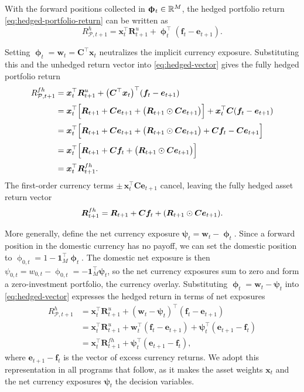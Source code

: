With the forward positions collected in $\bm{\upphi}_t\in\mathbb{R}^M$, the hedged portfolio return \eqref{eq:hedged-portfolio-return} can be written as
\begin{equation}
R^{h}_{\mathcal{P},t+1} = \bm{x}_t^\top \bm{R}^{u}_{t+1} + \bm{\upphi}_t^\top(\bm{f}_t-\bm{e}_{t+1}).
\label{eq:hedged-vector}
\end{equation}

Setting $\bm{\upphi}_t=\bm{w}_t=\bm{C}^\top\bm{x}_t$ neutralizes the implicit currency exposure. Substituting this and the unhedged return vector into \eqref{eq:hedged-vector} gives the fully hedged portfolio return
\begin{align*}
R^{fh}_{\mathcal{P},t+1}
&= \bm{x}_t^\top\bm{R}^{u}_{t+1} + \big(\bm{C}^\top\bm{x}_t\big)^\top(\bm{f}_t-\bm{e}_{t+1})\\[2pt]
&= \bm{x}_t^\top\Big[\bm{R}_{t+1} + \bm{C}\bm{e}_{t+1} + \big(\bm{R}_{t+1}\odot\bm{C}\bm{e}_{t+1}\big)\Big] + \bm{x}_t^\top\bm{C}(\bm{f}_t-\bm{e}_{t+1})\\[2pt]
&= \bm{x}_t^\top\Big[\bm{R}_{t+1} + \bm{C}\bm{e}_{t+1} + \big(\bm{R}_{t+1}\odot\bm{C}\bm{e}_{t+1}\big) + \bm{C}\bm{f}_t - \bm{C}\bm{e}_{t+1}\Big]\\[2pt]
&= \bm{x}_t^\top\Big[\bm{R}_{t+1} + \bm{C}\bm{f}_t + \big(\bm{R}_{t+1}\odot\bm{C}\bm{e}_{t+1}\big)\Big]\\[2pt]
&= \bm{x}_t^\top\bm{R}^{fh}_{t+1}.
\end{align*}
The first-order currency terms $\pm\,\bm{x}_t^\top\bm{C}\bm{e}_{t+1}$ cancel, leaving the fully hedged asset return vector
\begin{equation*}
\bm{R}^{fh}_{t+1}
=
\bm{R}_{t+1}
+
\bm{C}\bm{f}_t
+
(\bm{R}_{t+1}\odot\bm{C}\bm{e}_{t+1}).
\end{equation*}

More generally, define the net currency exposure $\bm{\psi}_t = \bm{w}_t-\bm{\upphi}_t$. Since a forward position in the domestic currency has no payoff, we can set the domestic position to $\upphi_{0,t} = 1 - \bm{1}_M^\top \bm{\upphi}_t$. The domestic net exposure is then $\psi_{0,t} = w_{0,t} - \upphi_{0,t} = -\bm{1}_M^\top \bm{\psi}_t$, so the net currency exposures sum to zero and form a zero-investment portfolio, the currency overlay. Substituting $\bm{\upphi}_t=\bm{w}_t-\bm{\psi}_t$ into \eqref{eq:hedged-vector} expresses the hedged return in terms of net exposures
\begin{align}
R^{h}_{\mathcal{P},t+1}
&= \bm{x}_t^\top \bm{R}^{u}_{t+1} + (\bm{w}_t-\bm{\psi}_t)^\top(\bm{f}_t-\bm{e}_{t+1})\nonumber \\[2pt]
&= \bm{x}_t^\top \bm{R}^{u}_{t+1} + \bm{w}_t^\top(\bm{f}_t-\bm{e}_{t+1}) + \bm{\psi}_t^\top(\bm{e}_{t+1}-\bm{f}_t) \nonumber\\[2pt]
&= \bm{x}_t^\top \bm{R}^{fh}_{t+1} + \bm{\psi}_t^\top(\bm{e}_{t+1}-\bm{f}_t),
\label{eq:hedged-net}
\end{align}
where $\bm{e}_{t+1} - \bm{f}_t$ is the vector of excess currency returns. We adopt this representation in all programs that follow, as it makes the asset weights $\bm{x}_t$ and the net currency exposures $\bm{\psi}_t$ the decision variables.

